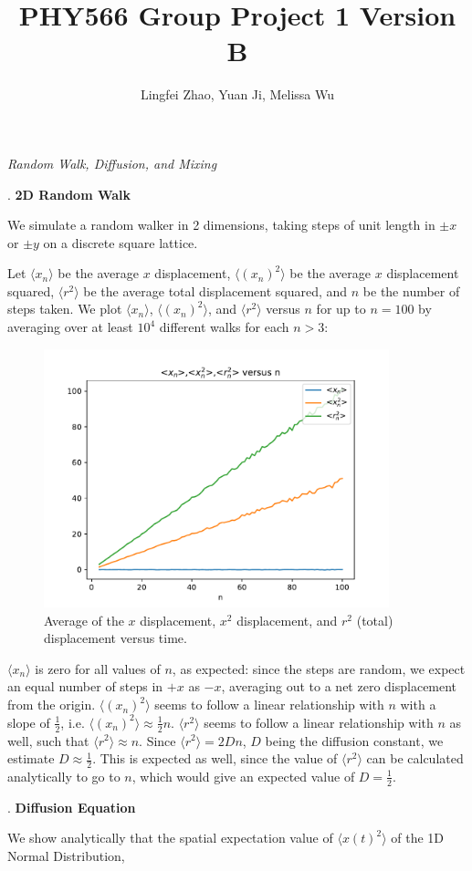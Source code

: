 \documentclass{article}
\begin{document}
\title{PHY566 Group Project 1 Version B}
\author{Lingfei Zhao, Yuan Ji, Melissa Wu}
\maketitle

\begin{center}
\textit{\large Random Walk, Diffusion, and Mixing}\par
\end{center}
. \textbf{2D Random Walk}\par
\smallskip
We simulate a random walker in 2 dimensions, taking steps of unit length in $\pm x$ or $\pm y$ on a discrete square lattice.\par
Let $\langle x_{n} \rangle$ be the average $x$ displacement, $\langle (x_{n})^{2} \rangle$ be the average $x$ displacement squared, $\langle r^{2} \rangle$ be the average total displacement squared, and $n$ be the number of steps taken. We plot $\langle x_{n} \rangle$, $\langle (x_{n})^{2} \rangle$, and $\langle r^{2} \rangle$ versus $n$ for up to $n = 100$ by averaging over at least $10^{4}$ different walks for each $n > 3$:\par
\begin{figure}[H]
\centering
\includegraphics[width=10cm]{P1_Yuan.pdf}
\caption{Average of the $x$ displacement, $x^{2}$ displacement, and $r^{2}$ (total) displacement versus time.}
\end{figure}
$\langle x_{n} \rangle$ is zero for all values of $n$, as expected: since the steps are random, we expect an equal number of steps in $+x$ as $-x$, averaging out to a net zero displacement from the origin. $\langle(x_{n})^{2} \rangle$ seems to follow a linear relationship with $n$ with a slope of $\frac{1}{2}$, i.e. $\langle(x_{n})^{2} \rangle \approx \frac{1}{2}n$. $\langle r^{2} \rangle$ seems to follow a linear relationship with $n$ as well, such that $\langle r^{2} \rangle \approx n$. Since $\langle r^{2} \rangle = 2Dn$, $D$ being the diffusion constant, we estimate $D \approx \frac{1}{2}$. This is expected as well, since the value of $\langle r^{2} \rangle$ can be calculated analytically to go to $n$, which would give an expected value of $D = \frac{1}{2}$.\par
\bigskip
{}. \textbf{Diffusion Equation}\par
\smallskip
We show analytically that the spatial expectation value of $\langle x(t)^{2} \rangle$ of the 1D Normal Distribution,
\end{document}
